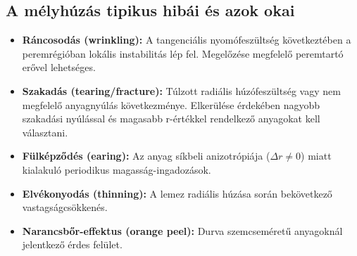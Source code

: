 \documentclass[12pt,a4paper,oneside]{report}
\begin{document}
\subsection{A mélyhúzás tipikus hibái és azok okai}
\begin{itemize}
    \item \textbf{Ráncosodás (wrinkling):} A tangenciális nyomófeszültség következtében a peremrégióban lokális instabilitás lép fel. Megelőzése megfelelő peremtartó erővel lehetséges.
    \item \textbf{Szakadás (tearing/fracture):} Túlzott radiális húzófeszültség vagy nem megfelelő anyagnyúlás következménye. Elkerülése érdekében nagyobb szakadási nyúlással és magasabb r-értékkel rendelkező anyagokat kell választani.
    \item \textbf{Fülképződés (earing):} Az anyag síkbeli anizotrópiája ($\Delta r \neq 0$) miatt kialakuló periodikus magasság-ingadozások.
    \item \textbf{Elvékonyodás (thinning):} A lemez radiális húzása során bekövetkező vastagságcsökkenés.
    \item \textbf{Narancsbőr-effektus (orange peel):} Durva szemcseméretű anyagoknál jelentkező érdes felület.
\end{itemize}
\end{document}
